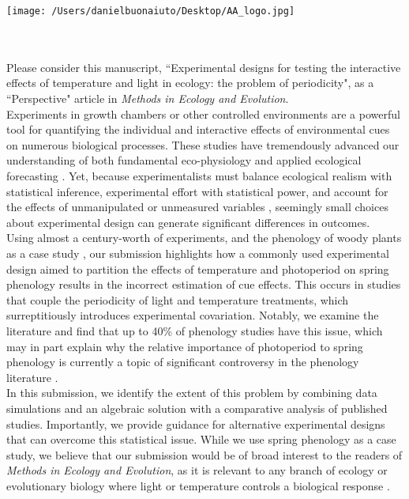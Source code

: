 \documentclass[11.5 pt]{article}
\begin{document}


\def\labelitemi{--}
\parindent=24pt
\noindent\texttt{[image: /Users/danielbuonaiuto/Desktop/AA\_logo.jpg]}
\\\\
\\ %
\vspace{1.5ex}

\noindent Please consider this manuscript, ``Experimental designs for testing the interactive effects of temperature and light in ecology: the problem of periodicity", as a ``Perspective" article in \textit{Methods in Ecology and Evolution}.\\

\noindent Experiments in growth chambers or other controlled environments are a powerful tool for quantifying the individual and interactive effects of environmental cues on numerous biological processes. These studies have tremendously advanced our understanding of both fundamental eco-physiology and applied ecological forecasting \citep{Osmond:2004wb}. Yet, because experimentalists must balance ecological realism with statistical inference, experimental effort with statistical power, and account for the effects of unmanipulated or unmeasured variables \citep{schneiner2001}, seemingly small choices about experimental design can generate significant differences in outcomes.\\

\noindent Using almost a century-worth of experiments, and the phenology of woody plants as a case study \citep{wolkovich2019}, our submission highlights how a commonly used experimental design aimed to partition the effects of temperature and photoperiod on spring phenology results in the incorrect estimation of cue effects. This occurs in studies that couple the periodicity of light and temperature treatments, which surreptitiously introduces experimental covariation. Notably, we examine the literature and find that up to 40\% of phenology studies have this issue, which may in part explain why the relative importance of photoperiod to spring phenology is currently a topic of significant controversy in the phenology literature \citep{koerner2010a,CHUINE:2010wg,Jennifer:2010un,Zohner:2016uz,WAY:2015aa}. \\

\noindent In this submission, we identify the extent of this problem by combining data simulations and an algebraic solution with a comparative analysis of published studies. Importantly, we provide guidance for alternative experimental designs that can overcome this statistical issue. While we use spring phenology as a case study, we believe that our submission would be of broad interest to the readers of \textit{Methods in Ecology and Evolution}, as it is relevant to any branch of ecology or evolutionary biology where light or temperature controls a biological response \citep[e.g.,][]{Franklin:2009wo,Brown:2014vn,Casal:2018us}.\\
\end{document}
